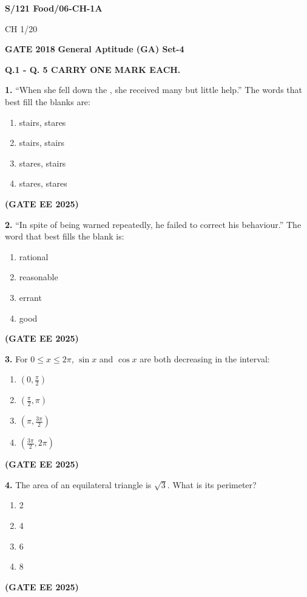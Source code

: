 \documentclass[journal,12pt,onecolumn]{IEEEtran}
\newcommand{\brak}[1]{(#1)}
\begin{document}
\noindent\textbf{S/121 Food/06-CH-1A}

\begin{center}
CH 1/20
\end{center}

\newpage

\sffamily
\begin{center}
\textbf{GATE 2018} \hfill \textbf{General Aptitude \brak{GA} Set-4}
\end{center}

\noindent\textbf{Q.1 - Q. 5 CARRY ONE MARK EACH.}

\noindent\textbf{1.} ``When she fell down the \underline{\hspace{2cm}}, she received many  \underline{\hspace{2cm}} but little help.''
The words that best fill the blanks are:
\begin{enumerate}
    \item stairs, stares
    \item stairs, stairs
    \item stares, stairs
    \item stares, stares
\end{enumerate}
\hfill \textbf{\brak{GATE EE 2025}}

\noindent\textbf{2.} ``In spite of being warned repeatedly, he failed to correct his \underline{\hspace{2cm}} behaviour.''
The word that best fills the blank is:
\begin{enumerate}
    \item rational
    \item reasonable
    \item errant
    \item good
\end{enumerate}
\hfill \textbf{\brak{GATE EE 2025}}

\noindent\textbf{3.} For $0 \le x \le 2\pi$, $\sin x$ and $\cos x$ are both decreasing in the interval:
\begin{enumerate}
    \item $\brak{0, \frac{\pi}{2}}$
    \item $\brak{\frac{\pi}{2}, \pi}$
    \item $\brak{\pi, \frac{3\pi}{2}}$
    \item $\brak{\frac{3\pi}{2}, 2\pi}$
\end{enumerate}
\hfill \textbf{\brak{GATE EE 2025}}

\noindent\textbf{4.} The area of an equilateral triangle is $\sqrt{3}$. What is its perimeter?
\begin{enumerate}
    \item 2
    \item 4
    \item 6
    \item 8
\end{enumerate}
\hfill \textbf{\brak{GATE EE 2025}}
\end{document}

